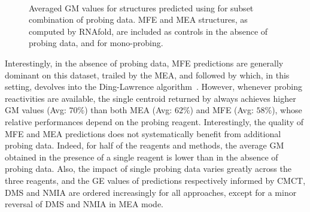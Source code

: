 \documentclass[a4,center,fleqn]{NAR}
\begin{document}
\begin{figure}
	{\\}
	
	\caption{Averaged GM values for structures  predicted using \OurTool{} for subset combination of probing data. MFE and MEA structures, as computed by RNAfold, are included as controls in the absence of probing data, and for mono-probing.}
	\label{cordero1}
\end{figure}


Interestingly, in the absence of probing data, MFE predictions are generally dominant on this dataset, trailed by the MEA, and followed by \OurTool which, in this setting, devolves into the Ding-Lawrence algorithm~\citep{Ding2003}. However, whenever probing reactivities are available, the single centroid returned by \OurTool always achieves higher GM values (Avg: $70\%$) than both MEA (Avg: $62\%$) and MFE  (Avg: $58\%$), whose relative performances depend on the probing reagent.%
Interestingly, the quality of MFE and MEA predictions does not systematically benefit from additional probing data. Indeed, for half of the reagents and methods, the average GM obtained in the presence of a single reagent is lower than in the absence of probing data. Also, the impact of single probing data varies greatly across the three reagents, and the GE values of predictions respectively informed by CMCT, DMS and NMIA are ordered increasingly for all approaches, except for a minor reversal of DMS and NMIA in MEA mode.
\end{document}
